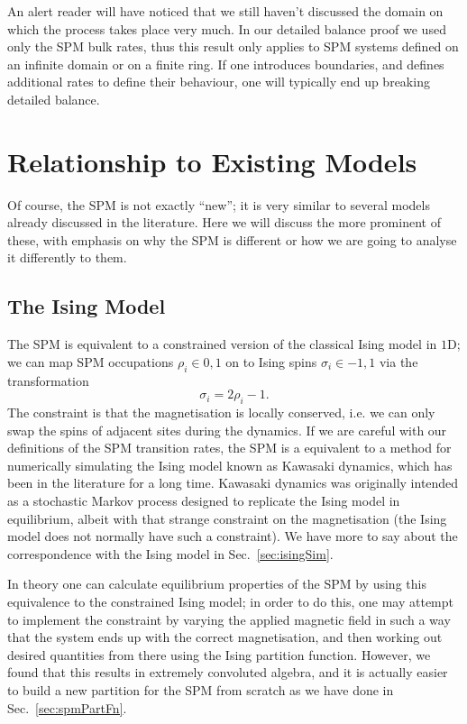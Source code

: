 An alert reader will have noticed that we still haven't discussed the domain on which the process takes 
place very much. In our detailed balance proof we used only the SPM bulk rates, thus this result only
applies to SPM systems defined on an infinite domain or on a finite ring. If one introduces boundaries,
and defines additional rates to define their behaviour, one will typically end up breaking detailed 
balance.

\section{Relationship to Existing Models} \label{sec:existingModels}
Of course, the SPM is not exactly ``new''; it is very similar to several models already discussed in the
literature. Here we will discuss the more prominent of these, with emphasis on why the SPM is different or
how we are going to analyse it differently to them.
\subsection{The Ising Model}
The SPM is equivalent to a constrained version of the classical Ising model in $1$D; we can map SPM
occupations $\rho_i \in {0, 1}$ on to Ising spins $\sigma_i \in {-1, 1}$ via the transformation
\begin{equation}
 \sigma_i = 2 \rho_i - 1 .
\end{equation}
The constraint is that the magnetisation is locally conserved, i.e. we can only swap the spins of adjacent
sites during the dynamics. If we are careful with our definitions of the SPM transition rates,
the SPM is a equivalent to a method for numerically simulating the Ising model known as Kawasaki
dynamics, which has been in the literature for a long time. Kawasaki dynamics was originally intended as
a stochastic Markov process designed to replicate the Ising model in equilibrium, albeit with that strange
constraint on the magnetisation (the Ising model does not normally have such a constraint). We have more 
to say about the correspondence with the Ising model in Sec.~\ref{sec:isingSim}.

In theory one can calculate equilibrium properties of the SPM by using this equivalence to the constrained
Ising model; in order to do this, one may attempt to implement the constraint by varying the applied
magnetic field in such a way that the system ends up with the correct magnetisation, and then working
out desired quantities from there using the Ising partition function. However, we found that this results
in extremely convoluted algebra, and it is actually easier to build a new partition for the SPM from 
scratch as we have done in Sec.~\ref{sec:spmPartFn}.
